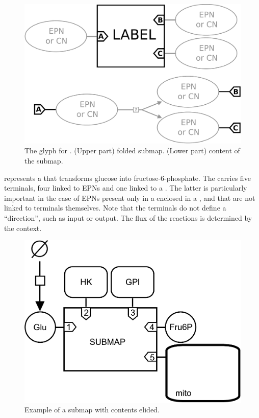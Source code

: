 \begin{figure}[H]
  \centering
  \includegraphics[scale = 0.22]{images/submap}
  \caption{The \PD glyph for . (Upper part) folded submap. (Lower part) content of the submap.}
  \label{fig:submap}
\end{figure}

 represents a  that transforms glucose into fructose-6-phosphate. The  carries five terminals, four linked to EPNs and one linked to a .  The latter is particularly important in the case of EPNs present only in a  enclosed in a , and that are not linked to terminals themselves.  Note that the terminals do not define a ``direction'', such as input or output.  The flux of the reactions is determined by the context.

\begin{figure}[H]
  \centering
  \includegraphics[scale = 0.4]{examples/submap-folded}
  \caption{Example of a submap with contents elided.}
  \label{fig:submap-folded}
\end{figure}

